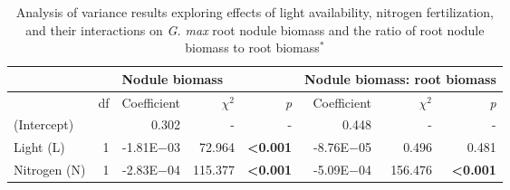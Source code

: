 \newpage
\begin{landscape}
\begin{table}
    \caption[Analysis of variance results exploring effects of light availability, nitrogen fertilization, and their interactions on \textit{G. max} root nodule biomass (g) and the ratio of root nodule biomass to root biomass (g g$^{-1}$)]{Analysis of variance results exploring effects of light availability, nitrogen fertilization, and their interactions on \textit{G. max} root nodule biomass and the ratio of root nodule biomass to root biomass$^*$}
    \centering
    \begin{tabular}{p{2.4cm}p{0.5cm}p{2cm}p{1.5cm}p{1.5cm}p{2cm}p{1.5cm}p{1.5cm}}
        && 
        \multicolumn{3}{l}{Nodule biomass} 
        & \multicolumn{3}{l}{Nodule biomass: root biomass} 
        \\
        \hline
        & \multicolumn{1}{r}{df}
        & \multicolumn{1}{r}{Coefficient}   & \multicolumn{1}{r}{$\chi^{2}$}        & \multicolumn{1}{r}{\textit{p}}
        & \multicolumn{1}{r}{Coefficient}   & \multicolumn{1}{r}{$\chi^{2}$}        & \multicolumn{1}{r}{\textit{p}}
        \\
        \hline
        
        (Intercept)
        && \multicolumn{1}{r}{0.302}        & \multicolumn{1}{r}{-}                 & \multicolumn{1}{r}{-}
        & \multicolumn{1}{r}{0.448}         & \multicolumn{1}{r}{-}                 & \multicolumn{1}{r}{-} 
        \\
    
        Light (L) & \multicolumn{1}{r}{1}
        & \multicolumn{1}{r}{-1.81E$-$03}     & \multicolumn{1}{r}{72.964}            & \multicolumn{1}{r}{\textbf{<0.001}}
        & \multicolumn{1}{r}{-8.76E$-$05}     & \multicolumn{1}{r}{0.496}             & \multicolumn{1}{r}{0.481} 
        \\
    
        Nitrogen (N) & \multicolumn{1}{r}{1}
        & \multicolumn{1}{r}{-2.83E$-$04}     & \multicolumn{1}{r}{115.377}           & \multicolumn{1}{r}{\textbf{<0.001}}
        & \multicolumn{1}{r}{-5.09E$-$04}     & \multicolumn{1}{r}{156.476}           & \multicolumn{1}{r}{\textbf{<0.001}} 
        \\
    

\end{tabular}
\end{table}
\end{landscape}
